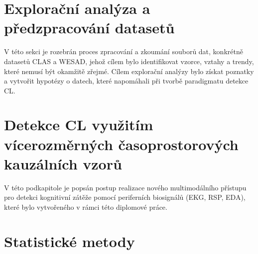 \section{Explorační analýza a předzpracování datasetů}
\label{sec:exploracni_analyza}
V této sekci je rozebrán proces zpracování a zkoumání souborů dat, konkrétně
datasetů CLAS a WESAD, jehož cílem bylo identifikovat vzorce, vztahy a trendy,
které nemusí být okamžitě zřejmé. Cílem explorační analýzy bylo získat poznatky
a vytvořit hypotézy o datech, které napomáhali při tvorbě paradigmatu detekce \gls{CL}.


\section{Detekce CL využitím vícerozměrných časoprostorových kauzálních vzorů}
\label{sec:hybridni_detekce}
V této podkapitole je popsán postup realizace nového multimodálního přístupu pro
detekci kognitivní zátěže pomocí periferních biosignálů (\gls{EKG}, \gls{RSP},
\gls{EDA}), které bylo vytvořeného v rámci této diplomové práce.


\section{Statistické metody}
\label{sec:statisticke_metody}


% 

% 

% 


